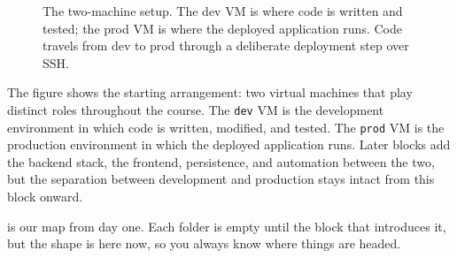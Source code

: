 



\begin{figure}
\centering
{}
\caption{The two-machine setup. The dev VM is where code is written and tested; the prod VM is where the deployed application runs. Code travels from dev to prod through a deliberate deployment step over SSH.}
\label{fig:two_machines}
\end{figure}

The figure shows the starting arrangement: two virtual machines
that play distinct roles throughout the course.
The \texttt{dev} VM is the development environment in which code is written, modified, and tested.
The \texttt{prod} VM is the production environment in which the deployed application runs.
Later blocks add the backend stack, the frontend, persistence, and automation between the two,
but the separation between development and production stays intact from this block onward.






\iffalse
{} is our map from day one.
Each folder is empty until the block that introduces it, but the shape is here now,
so you always know where things are headed.

